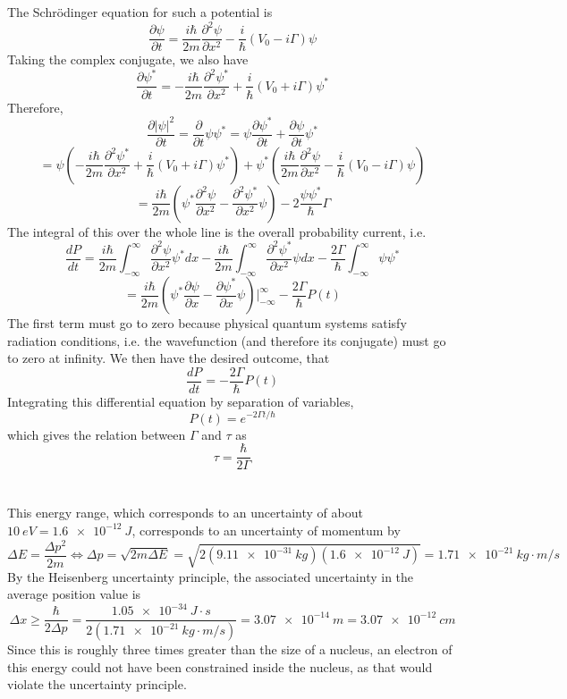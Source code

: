 \documentclass{article}
\begin{document}
\section{}
The Schr\"odinger equation for such a potential is
\[\frac{\partial \psi}{\partial t}=\frac{i\hbar}{2m}\frac{\partial^2\psi}{\partial x^2}-\frac{i}{\hbar}(V_0-i\Gamma)\psi\]
Taking the complex conjugate, we also have
\[\frac{\partial \psi^*}{\partial t}=-\frac{i\hbar}{2m}\frac{\partial^2\psi^*}{\partial x^2}+\frac{i}{\hbar}(V_0+i\Gamma)\psi^*\]
Therefore,
\[\frac{\partial |\psi|^2}{\partial t}=\frac{\partial}{\partial t}\psi\psi^*=\psi\frac{\partial \psi^*}{\partial t}+\frac{\partial \psi}{\partial t}\psi^*\]
\[=\psi\left( -\frac{i\hbar}{2m}\frac{\partial^2\psi^*}{\partial x^2}+\frac{i}{\hbar}(V_0+i\Gamma)\psi^* \right)+\psi^*\left(\frac{i\hbar}{2m}\frac{\partial^2 \psi}{\partial x^2}-\frac{i}{\hbar}(V_0-i\Gamma)\psi  \right)\]
\[=\frac{i\hbar}{2m}\left( \psi^*\frac{\partial^2\psi}{\partial x^2}-\frac{\partial^2\psi^*}{\partial x^2}\psi \right)-2\frac{\psi\psi^*}{\hbar}\Gamma\]
The integral of this over the whole line is the overall probability current, i.e.
\[\frac{dP}{dt}=\frac{i\hbar}{2m}\int_{-\infty}^\infty\frac{\partial^2\psi}{\partial x^2}\psi^*dx-\frac{i\hbar}{2m}\int_{-\infty}^\infty\frac{\partial^2\psi^*}{\partial x^2}\psi dx-\frac{2\Gamma}{\hbar}\int_{-\infty}^{\infty}\psi\psi^*\]
\[=\frac{i\hbar}{2m}\left( \psi^*\frac{\partial \psi}{\partial x}-\frac{\partial \psi^*}{\partial x}\psi \right)\bigg|_{-\infty}^\infty-\frac{2\Gamma}{\hbar}P(t)\]
The first term must go to zero because physical quantum systems satisfy radiation conditions, i.e. the wavefunction (and therefore its conjugate) must go to zero at infinity. We then have the desired outcome, that
\[\frac{dP}{dt}=-\frac{2\Gamma}{\hbar}P(t)\]
Integrating this differential equation by separation of variables,
\[P(t)=e^{-2\Gamma t/\hbar}\]
which gives the relation between $\Gamma$ and $\tau$ as
\[\tau=\frac{\hbar}{2\Gamma}\]

\section{}
This energy range, which corresponds to an uncertainty of about $\SI{10}{eV}=\SI{1.6e-12}{J}$, corresponds to an uncertainty of  momentum by
\[\Delta E=\frac{\Delta p^2}{2m}\Leftrightarrow \Delta p=\sqrt{2m\Delta E}=\sqrt{2(\SI{9.11e-31}{kg})(\SI{1.6e-12}{J})}=\SI{1.71e-21}{kg\cdot m/s}\]
By the Heisenberg uncertainty principle, the associated uncertainty in the average position value is
\[\Delta x\geq\frac{\hbar}{2\Delta p}=\frac{\SI{1.05e-34}{J\cdot s}}{2(\SI{1.71e-21}{kg\cdot m/s})}=\SI{3.07e-14}{m}=\SI{3.07e-12}{cm}\]
Since this is roughly three times greater than the size of a nucleus, an electron of this energy could not have been constrained inside the nucleus, as that would violate the uncertainty principle.
\end{document}
